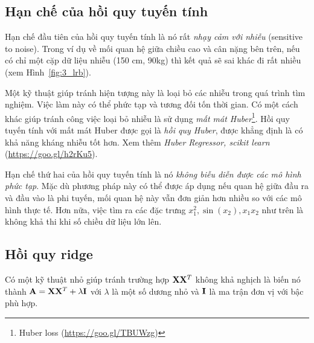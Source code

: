 \subsection{Hạn chế của hồi quy tuyến tính}

Hạn chế đầu tiên của hồi quy tuyến tính là nó rất \textit{nhạy cảm với nhiễu} (sensitive to noise). Trong ví dụ về mối quan hệ giữa chiều cao và cân
nặng bên trên, nếu có chỉ một cặp dữ liệu {nhiễu} (150 cm, 90kg) thì kết
quả sẽ sai khác đi rất nhiều (xem Hình~\ref{fig:3_lrb}).


Một kỹ thuật giúp tránh hiện tượng này là loại bỏ các nhiễu trong quá trình tìm nghiệm. Việc làm này có thể phức tạp và tương đối tốn thời gian. Có một cách khác giúp tránh công việc loại bỏ nhiễu là sử dụng \textit{mất mát Huber}\footnote{Huber loss (\url{https://goo.gl/TBUWzg})}. Hồi quy tuyến tính với mất mát Huber được gọi là \textit{hồi quy Huber}, được khẳng định là có khả năng kháng nhiễu tốt hơn. Xem thêm \textit{Huber Regressor, scikit learn} (\url{https://goo.gl/h2rKu5}).

Hạn chế thứ hai của hồi quy tuyến tính là nó \textit{không biễu diễn được các mô
hình phức tạp}. Mặc dù phương pháp này có thể được áp dụng nếu quan
hệ giữa đầu ra và đầu vào là phi tuyến, mối quan hệ này vẫn đơn giản hơn
nhiều so với các mô hình thực tế. Hơn nữa, việc tìm ra các đặc trưng $x_1^2,
\sin(x_2), x_1x_2$ như trên là không khả thi khi số chiều dữ liệu lớn lên.


\subsection{Hồi quy ridge}

Có một kỹ thuật nhỏ giúp tránh trường hợp $\mathbf{X}\mathbf{X}^T$ không khả nghịch là biến nó thành $\mathbf{A} = \mathbf{X}\mathbf{X}^T + \lambda\mathbf{I}$ với $\lambda$ là một số dương nhỏ
và $\mathbf{I}$ là ma trận đơn vị với bậc phù hợp.

